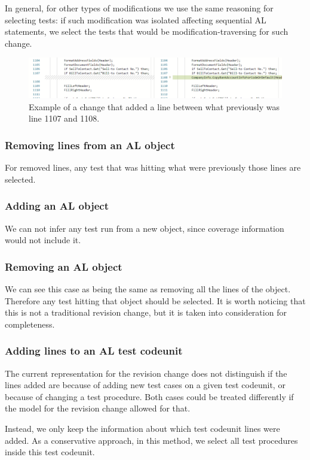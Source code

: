 \documentclass{article}
\begin{document}
In general, for other types of modifications we use the same reasoning for selecting tests: if such modification was isolated affecting sequential AL statements, we select the tests that would be modification-traversing for such change.

\begin{figure}[H]
  \includegraphics[width=\textwidth]{images/addinglinechange.png}
  \caption{Example of a change that added a line between what previously was line 1107 and 1108.}
  \label{fig:addinglinechange}
\end{figure}

\subsubsection{Removing lines from an AL object}
For removed lines, any test that was hitting what were previously those lines are selected.
\subsubsection{Adding an AL object}
We can not infer any test run from a new object, since coverage information would not include it.
\subsubsection{Removing an AL object}
We can see this case as being the same as removing all the lines of the object. Therefore any test hitting that object should be selected. It is worth noticing that this is not a traditional revision change, but it is taken into consideration for completeness.
\subsubsection{Adding lines to an AL test codeunit}
The current representation for the revision change does not distinguish if the lines added are because of adding new test cases on a given test codeunit, or because of changing a test procedure. Both cases could be treated differently if the model for the revision change allowed for that.

Instead, we only keep the information about which test codeunit lines were added. As a conservative approach, in this method, we select all test procedures inside this test codeunit.
\end{document}
